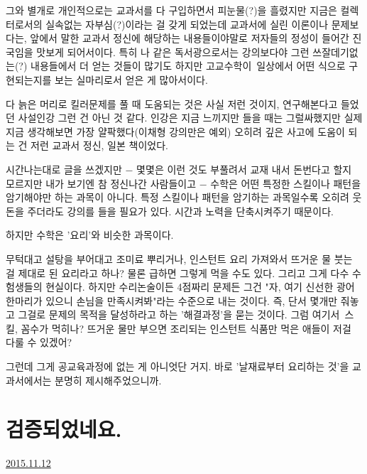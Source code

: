 그와 별개로 개인적으로는 교과서를 다 구입하면서 피눈물(?)을 흘렸지만 지금은 컬렉터로서의 실속없는 자부심(?)이라는 걸 갖게 되었는데
교과서에 실린 이론이나 문제보다는, 앞에서 말한 교과서 정신에 해당하는 내용들이야말로 저자들의 정성이 들어간 진국임을 맛보게 되어서이다.
특히 나 같은 독서광으로서는 강의보다야 그런 쓰잘데기없는(?) 내용들에서 더 얻는 것들이 많기도 하지만
고교수학이 일상에서 어떤 식으로 구현되는지를 보는 실마리로서 얻은 게 많아서이다.
\vspace{5mm}

다 늙은 머리로 킬러문제를 풀 때 도움되는 것은 사실 저런 것이지, 연구해본다고 들었던 사설인강 그런 건 아닌 것 같다.
인강은 지금 느끼지만 들을 때는 그럴싸했지만 실제 지금 생각해보면 가장 얄팍했다(이채형 강의만은 예외)
오히려 깊은 사고에 도움이 되는 건 저런 교과서 정신, 일본 책이었다.
\vspace{5mm}

시간나는대로 글을 쓰겠지만 $-$ 몇몇은 이런 것도 부풀려서 교재 내서 돈번다고 할지 모르지만 내가 보기엔 참 정신나간 사람들이고 $-$
수학은 어떤 특정한 스킬이나 패턴을 암기해야만 하는 과목이 아니다.
특정 스킬이나 패턴을 암기하는 과목일수록 오히려 웃돈을 주더라도 강의를 들을 필요가 있다. 시간과 노력을 단축시켜주기 때문이다.
\vspace{5mm}

하지만 수학은 '요리'와 비슷한 과목이다.
\vspace{5mm}

무턱대고 설탕을 부어대고 조미료 뿌리거나, 인스턴트 요리 가져와서 뜨거운 물 붓는 걸 제대로 된 요리라고 하나?
물론 급하면 그렇게 먹을 수도 있다. 그리고 그게 다수 수험생들의 현실이다.
하지만 수리논술이든 4점짜리 문제든 그건 "자, 여기 신선한 광어 한마리가 있으니 손님을 만족시켜봐"라는 수준으로 내는 것이다.
즉, 단서 몇개만 줘놓고 그걸로 문제의 목적을 달성하라고 하는 '해결과정'을 묻는 것이다.
그럼 여기서 스킬, 꼼수가 먹히나? 뜨거운 물만 부으면 조리되는 인스턴트 식품만 먹은 애들이 저걸 다룰 수 있겠어?
\vspace{5mm}

그런데 그게 공교육과정에 없는 게 아니엇단 거지. 바로 '날재료부터 요리하는 것'을 교과서에서는 분명히 제시해주었으니까.
\vspace{5mm}






\section{검증되었네요.}
\href{https://www.kockoc.com/Apoc/479357}{2015.11.12}

